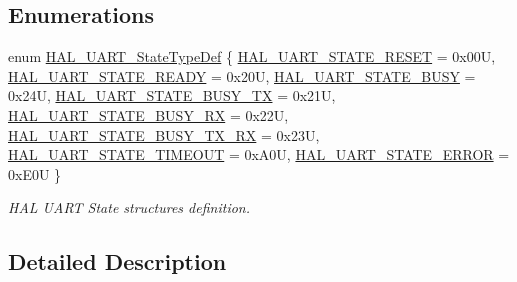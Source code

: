 \subsection*{Enumerations}
\begin{DoxyCompactItemize}
\item 
enum \hyperlink{group___u_a_r_t___exported___types_gaf55d844a35379c204c90be5d1e8e50ba}{H\+A\+L\+\_\+\+U\+A\+R\+T\+\_\+\+State\+Type\+Def} \{ \newline
\hyperlink{group___u_a_r_t___exported___types_ggaf55d844a35379c204c90be5d1e8e50baa9c7d889fce61ccc717228d099a61d113}{H\+A\+L\+\_\+\+U\+A\+R\+T\+\_\+\+S\+T\+A\+T\+E\+\_\+\+R\+E\+S\+ET} = 0x00U, 
\hyperlink{group___u_a_r_t___exported___types_ggaf55d844a35379c204c90be5d1e8e50baade763629c1bdb4f08e52ef79d6e0900e}{H\+A\+L\+\_\+\+U\+A\+R\+T\+\_\+\+S\+T\+A\+T\+E\+\_\+\+R\+E\+A\+DY} = 0x20U, 
\hyperlink{group___u_a_r_t___exported___types_ggaf55d844a35379c204c90be5d1e8e50baad1eddce038ba828e8b4061a33a2d8801}{H\+A\+L\+\_\+\+U\+A\+R\+T\+\_\+\+S\+T\+A\+T\+E\+\_\+\+B\+U\+SY} = 0x24U, 
\hyperlink{group___u_a_r_t___exported___types_ggaf55d844a35379c204c90be5d1e8e50baadc97ca42e9b05a08cb98e6721e27e80c}{H\+A\+L\+\_\+\+U\+A\+R\+T\+\_\+\+S\+T\+A\+T\+E\+\_\+\+B\+U\+S\+Y\+\_\+\+TX} = 0x21U, 
\newline
\hyperlink{group___u_a_r_t___exported___types_ggaf55d844a35379c204c90be5d1e8e50baaf7929f7aebd6b450c25907904411680b}{H\+A\+L\+\_\+\+U\+A\+R\+T\+\_\+\+S\+T\+A\+T\+E\+\_\+\+B\+U\+S\+Y\+\_\+\+RX} = 0x22U, 
\hyperlink{group___u_a_r_t___exported___types_ggaf55d844a35379c204c90be5d1e8e50baa2fdde93f9f55972b7133bf7c75dd2e8a}{H\+A\+L\+\_\+\+U\+A\+R\+T\+\_\+\+S\+T\+A\+T\+E\+\_\+\+B\+U\+S\+Y\+\_\+\+T\+X\+\_\+\+RX} = 0x23U, 
\hyperlink{group___u_a_r_t___exported___types_ggaf55d844a35379c204c90be5d1e8e50baa90891eeb767df19780e620a15bec807d}{H\+A\+L\+\_\+\+U\+A\+R\+T\+\_\+\+S\+T\+A\+T\+E\+\_\+\+T\+I\+M\+E\+O\+UT} = 0x\+A0U, 
\hyperlink{group___u_a_r_t___exported___types_ggaf55d844a35379c204c90be5d1e8e50baa5d50bfe0750db02c4fd03d778c8c318c}{H\+A\+L\+\_\+\+U\+A\+R\+T\+\_\+\+S\+T\+A\+T\+E\+\_\+\+E\+R\+R\+OR} = 0x\+E0U
 \}\begin{DoxyCompactList}\small\item\em H\+AL U\+A\+RT State structures definition. \end{DoxyCompactList}
\end{DoxyCompactItemize}


\subsection{Detailed Description}



